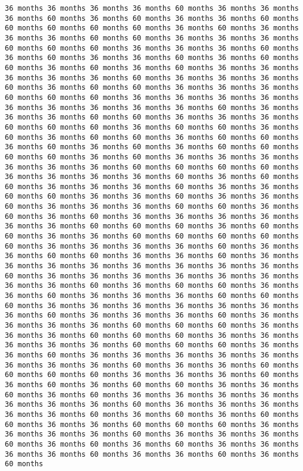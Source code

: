 \documentclass[11pt]{article}
\begin{document}
\begin{Verbatim}[commandchars=\\\{\}, frame=single, framerule=2mm, rulecolor=\color{outerrorbackground}]
36 months 36 months 36 months 36 months 60 months 36 months 36 months 36 months 60 months 36 months 60 months 36 months 36 months 60 months 60 months 60 months 60 months 60 months 36 months 60 months 36 months 36 months 36 months 60 months 60 months 36 months 36 months 36 months 60 months 60 months 60 months 36 months 36 months 36 months 60 months 36 months 60 months 36 months 36 months 60 months 36 months 60 months 60 months 36 months 60 months 36 months 60 months 36 months 36 months 36 months 36 months 36 months 60 months 36 months 36 months 36 months 60 months 36 months 60 months 60 months 36 months 36 months 36 months 60 months 60 months 60 months 36 months 36 months 36 months 36 months 36 months 36 months 36 months 36 months 36 months 60 months 36 months 36 months 36 months 60 months 60 months 36 months 36 months 36 months 60 months 60 months 60 months 36 months 60 months 60 months 36 months 60 months 36 months 60 months 60 months 36 months 60 months 60 months 36 months 60 months 36 months 60 months 36 months 60 months 60 months 60 months 60 months 36 months 60 months 36 months 36 months 36 months 36 months 36 months 36 months 60 months 60 months 60 months 60 months 36 months 36 months 36 months 36 months 60 months 36 months 60 months 60 months 36 months 36 months 36 months 60 months 36 months 36 months 60 months 60 months 36 months 36 months 60 months 36 months 36 months 60 months 36 months 36 months 36 months 60 months 60 months 36 months 60 months 36 months 60 months 36 months 36 months 36 months 36 months 36 months 36 months 60 months 60 months 60 months 36 months 60 months 60 months 36 months 36 months 60 months 60 months 60 months 60 months 60 months 36 months 36 months 36 months 36 months 60 months 36 months 36 months 60 months 60 months 36 months 36 months 60 months 36 months 36 months 36 months 36 months 36 months 36 months 36 months 36 months 60 months 36 months 36 months 36 months 36 months 36 months 36 months 36 months 36 months 60 months 36 months 60 months 60 months 36 months 36 months 60 months 36 months 36 months 36 months 60 months 60 months 60 months 36 months 36 months 36 months 36 months 36 months 36 months 36 months 60 months 36 months 36 months 36 months 60 months 36 months 36 months 36 months 36 months 60 months 60 months 60 months 36 months 36 months 36 months 60 months 60 months 60 months 36 months 36 months 36 months 36 months 36 months 60 months 60 months 60 months 36 months 36 months 60 months 36 months 36 months 36 months 36 months 36 months 36 months 36 months 36 months 60 months 36 months 36 months 60 months 60 months 60 months 60 months 36 months 36 months 36 months 60 months 36 months 60 months 36 months 60 months 60 months 36 months 36 months 60 months 36 months 60 months 36 months 36 months 36 months 36 months 36 months 36 months 36 months 60 months 36 months 36 months 36 months 36 months 36 months 60 months 36 months 60 months 36 months 60 months 60 months 36 months 36 months 60 months 60 months 60 months 36 months 36 months 36 months 36 months 60 months 36 months 36 months 36 months 60 months 36 months 60 months 36 months 60 months 36 months 36 months 36 months 36 months 60 months 36 months 36 months 60 months 36 months 60 months 
\end{Verbatim}
\end{document}
